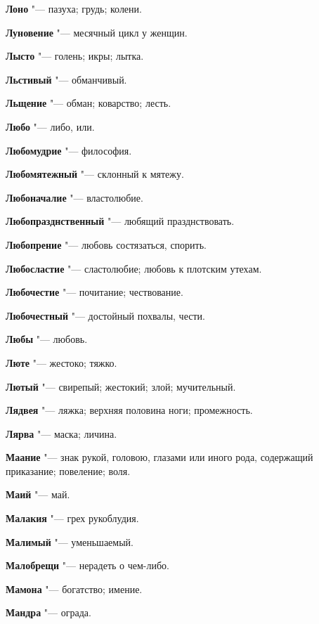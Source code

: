 \begin{mymulticols}
\noindent\textbf{Лоно} "--- пазуха; грудь; колени. 

\noindent\textbf{Луновение} "--- месячный цикл у женщин. 

\noindent\textbf{Лысто} "--- голень; икры; лытка. 

\noindent\textbf{Льстивый} "--- обманчивый. 

\noindent\textbf{Льщение} "--- обман; коварство; лесть. 

\noindent\textbf{Любо} "--- либо, или. 

\noindent\textbf{Любомудрие} "--- философия. 

\noindent\textbf{Любомятежный} "--- склонный к мятежу. 

\noindent\textbf{Любоначалие} "--- властолюбие. 

\noindent\textbf{Любопразднственный} "--- любящий празднствовать. 

\noindent\textbf{Любопрение} "--- любовь состязаться, спорить. 

\noindent\textbf{Любосластие} "--- сластолюбие; любовь к плотским утехам. 

\noindent\textbf{Любочестие} "--- почитание; чествование. 

\noindent\textbf{Любочестный} "--- достойный похвалы, чести. 

\noindent\textbf{Любы} "--- любовь. 

\noindent\textbf{Люте} "--- жестоко; тяжко. 

\noindent\textbf{Лютый} "--- свирепый; жестокий; злой; мучительный. 

\noindent\textbf{Лядвея} "--- ляжка; верхняя половина ноги; промежность. 

\noindent\textbf{Лярва} "--- маска; личина. 

\bukvaending


\noindent\textbf{Маание} "--- знак рукой, головою, глазами или иного рода, содержащий приказание; повеление; воля. 

\noindent\textbf{Маий} "--- май. 

\noindent\textbf{Малакия} "--- грех рукоблудия. 

\noindent\textbf{Малимый} "--- уменьшаемый. 

\noindent\textbf{Малобрещи} "--- нерадеть о чем-либо. 

\noindent\textbf{Мамона} "--- богатство; имение. 

\noindent\textbf{Мандра} "--- ограда. 


\end{mymulticols}
